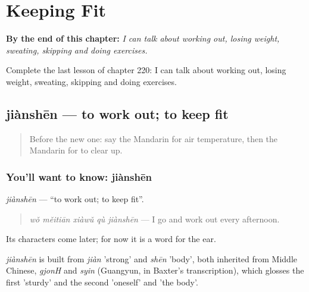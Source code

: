 
\chapter{Keeping Fit}
\label{ch:zh-keeping-fit}

\begin{chapteropening}
\textbf{By the end of this chapter:} \emph{I can talk about working out, losing weight, sweating, skipping and doing exercises.}

Complete the last lesson of chapter 220: I can talk about working out, losing weight, sweating, skipping and doing exercises.
\end{chapteropening}

\section[jiànshēn]{jiànshēn — to work out; to keep fit}

\label{lesson:ZH-C220-jianshen}



\begin{quote}
Before the new one: say the Mandarin for air temperature, then the Mandarin for to clear up.
\end{quote}

\subsection*{You'll want to know: jiànshēn}
\emph{jiànshēn} — \textquotedblleft{}to work out; to keep fit\textquotedblright{}.

\begin{quote}
\emph{wǒ měitiān xiàwǔ qù jiànshēn} — I go and work out every afternoon.
\end{quote}

Its characters come later; for now it is a word for the ear.

\begin{cousinweb}
\emph{jiànshēn} is built from \emph{jiàn} 'strong' and \emph{shēn} 'body', both inherited from Middle Chinese, \emph{gjonH} and \emph{syin} (Guangyun, in Baxter's transcription), which glosses the first 'sturdy' and the second 'oneself' and 'the body'.
\end{cousinweb}

